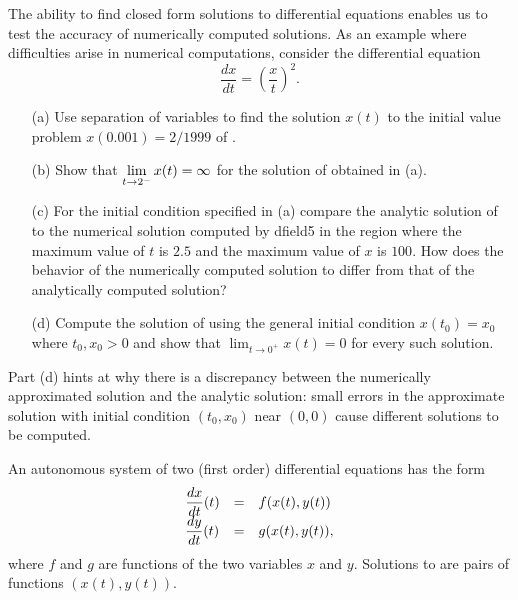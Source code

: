 \begin{exercise} \label{c14.1.18}
The ability to find closed form solutions to differential equations enables
us to test the accuracy of numerically computed solutions.  As an example where difficulties arise in numerical computations, consider the differential 
equation
\begin{equation} \label{eq:exivp}
\frac{dx}{dt} = \left(\frac{x}{t}\right)^2.
\end{equation}
\begin{itemize}
\item[(a)] Use separation of variables to find the solution $x(t)$ to the 
initial value problem $x(0.001) = 2/1999$ of .
\item[(b)] Show that $\displaystyle\lim_{t\to 2^-}x(t)=\infty$ for the solution of 
 obtained in (a).
\item[(c)] For the initial condition specified in (a) compare the analytic 
solution of  to the numerical solution computed by {\sf dfield5} 
in the region where the maximum value of $t$ is $2.5$ and the maximum value of 
$x$ is $100$.  How does the behavior of the numerically computed solution 
to  differ from that of the analytically computed solution?
\item[(d)]  Compute the solution of  using the general initial 
condition $x(t_0) = x_0$ where $t_0,x_0>0$ and show that 
$\lim_{t\to 0^+}x(t)=0$ for every such solution. 
\end{itemize}
 Part (d) hints at why there is a discrepancy 
between the numerically approximated solution and the analytic solution: 
small errors in the approximate solution with initial condition $(t_0,x_0)$ 
near $(0,0)$ cause different solutions to be computed.
\end{exercise}

 

\label{sec:UncoupledLS}

An autonomous system of two (first order) 
differential equations 
has the form
\renewcommand{\arraystretch}{1.8}
\begin{equation} \label{e:aut2}
\begin{array}{lll}
\displaystyle \frac{dx}{dt}(t)  & = & f(x(t),y(t)) \\
\displaystyle \frac{dy}{dt}(t)  & = & g(x(t),y(t)),
\end{array}
\end{equation}
where $f$ and $g$ are functions of the two variables $x$
and $y$.  Solutions to  are pairs of functions
$(x(t),y(t))$.

